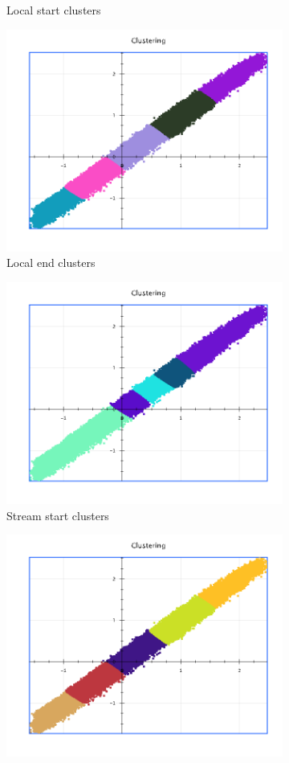 \documentclass{lmproj}
\begin{document}
\begin{figure}[H]
\begin{subfigure}{.5\textwidth}
		\caption*{Local start clusters}
		\label{fig:local_50_50_k_5_start}
	\end{subfigure}%
	\begin{subfigure}{.5\textwidth}
		\centering
		\includegraphics[width=.8\linewidth]{cluster_visualization/local_50_50_k_5_end}
		\caption*{Local end clusters}
		\label{fig:local_50_50_k_5_end}
	\end{subfigure}
	\begin{subfigure}{.5\textwidth}
		\centering
		\includegraphics[width=.8\linewidth]{cluster_visualization/stream_50_50_k_5_start}
		\caption*{Stream start clusters}
		\label{fig:stream_50_50_k_5_start}
	\end{subfigure}%
	\begin{subfigure}{.5\textwidth}
		\centering
		\includegraphics[width=.8\linewidth]{cluster_visualization/stream_50_50_k_5_end}

\end{subfigure}
\end{figure}
\end{document}
